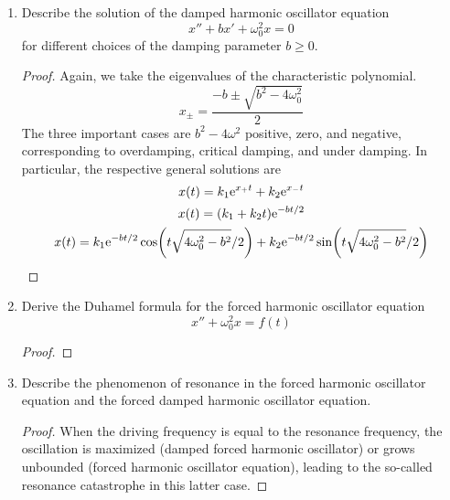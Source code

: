 \documentclass[../psets.tex]{subfiles}
\begin{document}
\begin{enumerate}
\begin{proof}
        \begin{equation*}
            L\ddot{I}(t)+R\dot{I}(t)+\frac{1}{C}I(t) = \dot{V}(t)
        \end{equation*}
        To get our final equation, use the complex voltage $V(t)=V_0\e[i\omega t]$ and divide through by $L$.
        \begin{equation*}
            \ddot{I}+\frac{R}{L}\dot{I}+\frac{1}{LC}I = \frac{i\omega V_0}{L}\e[i\omega t]
        \end{equation*}
    \end{proof}
    \item Describe the solution of the damped harmonic oscillator equation
    \begin{equation*}
        x''+bx'+\omega_0^2x = 0
    \end{equation*}
    for different choices of the damping parameter $b\geq 0$.
    \begin{proof}
        Again, we take the eigenvalues of the characteristic polynomial.
        \begin{equation*}
            x_\pm = \frac{-b\pm\sqrt{b^2-4\omega_0^2}}{2}
        \end{equation*}
        The three important cases are $b^2-4\omega^2$ positive, zero, and negative, corresponding to overdamping, critical damping, and under damping. In particular, the respective general solutions are
        \begin{gather*}
            x(t) = k_1\e[x_+t]+k_2\e[x_-t]\\
            x(t) = (k_1+k_2t)\e[-bt/2]\\
            x(t) = k_1\e[-bt/2]\cos(t\sqrt{4\omega_0^2-b^2}/2)+k_2\e[-bt/2]\sin(t\sqrt{4\omega_0^2-b^2}/2)
        \end{gather*}
    \end{proof}
    \item Derive the Duhamel formula for the forced harmonic oscillator equation
    \begin{equation*}
        x''+\omega_0^2x = f(t)
    \end{equation*}
    \begin{proof}
        
    \end{proof}
    \item Describe the phenomenon of resonance in the forced harmonic oscillator equation and the forced damped harmonic oscillator equation.
    \begin{proof}
        When the driving frequency is equal to the resonance frequency, the oscillation is maximized (damped forced harmonic oscillator) or grows unbounded (forced harmonic oscillator equation), leading to the so-called resonance catastrophe in this latter case.
    \end{proof}
\end{enumerate}
\end{document}
